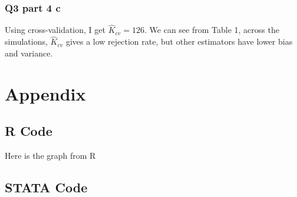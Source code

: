 \documentclass[11pt]{article}
\begin{document}
\begin{center}
	
\end{center}


\subsubsection{Q3 part 4 c}

Using cross-validation, I get $\hat{K}_{cv} = 126$. We can see from Table 1, across the simulations,
$\hat{K}_{cv}$ gives a  low rejection rate, but other estimators have lower bias and variance.

\section{Appendix}
\subsection{R Code}
Here is the graph from R 
 

\subsection{STATA Code}


\end{document}
